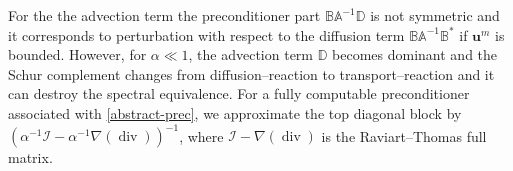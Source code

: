 \documentclass[11pt, reqno, a4paper, twoside]{article}
\newcommand{\bn}{\boldsymbol{n}}
\newcommand{\bu}{\boldsymbol{u}}
\newcommand{\bbA}{\mathbb{A}}
\newcommand{\bbD}{\mathbb{D}}
\newcommand{\bbB}{\mathbb{B}}
\newcommand{\bbC}{\mathbb{C}}
\newcommand{\cI}{\mathcal{I}}
\newcommand{\cT}{\mathcal{T}}
\newcommand{\cS}{\mathcal{S}}
\newcommand\vdiv{\mathop{\mathrm{div}}\nolimits}
\numberwithin{equation}{section}
\numberwithin{remark}{section}
\numberwithin{figure}{section}
\numberwithin{table}{section}
\newcommand{\rrb}[1]{{\leavevmode\color{lightgreen}{#1}}}
\begin{document}
{For the the advection term the preconditioner part $\bbB\bbA^{-1}\bbD$ is not symmetric and it corresponds to   perturbation with respect to the diffusion term $\bbB\bbA^{-1}\bbB^*$ if $
\bu^m$ is bounded. However, for $\alpha \ll 1$,  the advection term $\bbD$ becomes dominant and the Schur complement changes from diffusion--reaction to transport--reaction and it can destroy the spectral equivalence. For a fully computable preconditioner associated with \eqref{abstract-prec}, we approximate the top diagonal block by $(\alpha^{-1} \cI - \alpha^{-1}\nabla(\vdiv) )^{-1}$, 
where $\cI - \nabla(\vdiv)$ 
is the Raviart--Thomas full matrix. }
\end{document}
